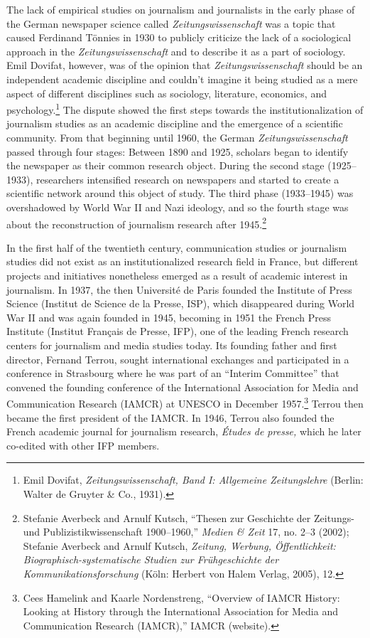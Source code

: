 \documentclass{tufte-handout}
\begin{document}
The lack of empirical studies on journalism and journalists in the early
phase of the German newspaper science called \emph{Zeitungswissenschaft}
was a topic that caused Ferdinand Tönnies in 1930 to publicly criticize
the lack of a sociological approach in the \emph{Zeitungswissenschaft}
and to describe it as a part of sociology. Emil Dovifat, however, was of
the opinion that \emph{Zeitungswissenschaft} should be an independent
academic discipline and couldn't imagine it being studied as a mere
aspect of different disciplines such as sociology, literature,
economics, and psychology.\footnote{Emil Dovifat,
  \emph{Zeitungswissenschaft, Band I: Allgemeine Zeitungslehre} (Berlin:
  Walter de Gruyter \& Co., 1931).} The dispute showed the first steps
towards the institutionalization of journalism studies as an academic
discipline and the emergence of a scientific community. From that
beginning until 1960, the German \emph{Zeitungswissenschaft} passed
through four stages: Between 1890 and 1925, scholars began to identify
the newspaper as their common research object. During the second stage
(1925--1933), researchers intensified research on newspapers and started
to create a scientific network around this object of study. The third
phase (1933--1945) was overshadowed by World War II and Nazi ideology,
and so the fourth stage was about the reconstruction of journalism
research after 1945.\footnote{Stefanie Averbeck and Arnulf Kutsch,
  ``Thesen zur Geschichte der Zeitungs- und Publizistikwissenschaft
  1900--1960,'' \emph{Medien \& Zeit} 17, no. 2--3 (2002); Stefanie
  Averbeck and Arnulf Kutsch, \emph{Zeitung, Werbung, Öffentlichkeit:
  Biographisch-systematische Studien zur Frühgeschichte der
  Kommunikationsforschung} (Köln: Herbert von Halem Verlag, 2005), 12.}

In the first half of the twentieth century, communication studies or
journalism studies did not exist as an institutionalized research field
in France, but different projects and initiatives nonetheless emerged as
a result of academic interest in journalism. In 1937, the then
Université de Paris founded the Institute of Press Science (Institut de
Science de la Presse, ISP), which disappeared during World War II and
was again founded in 1945, becoming in 1951 the French Press Institute
(Institut Français de Presse, IFP), one of the leading French research
centers for journalism and media studies today. Its founding father and
first director, Fernand Terrou, sought international exchanges and
participated in a conference in Strasbourg where he was part of an
``Interim Committee'' that convened the founding conference of the
International Association for Media and Communication Research (IAMCR)
at UNESCO in December 1957.\footnote{Cees Hamelink and Kaarle
  Nordenstreng, ``Overview of IAMCR History: Looking at History through
  the International Association for Media and Communication Research
  (IAMCR),'' IAMCR (website).} Terrou then became the first president of
the IAMCR. In 1946, Terrou also founded the French academic journal for
journalism research, \emph{Études de presse,} which he later co-edited
with other IFP members.
\end{document}
